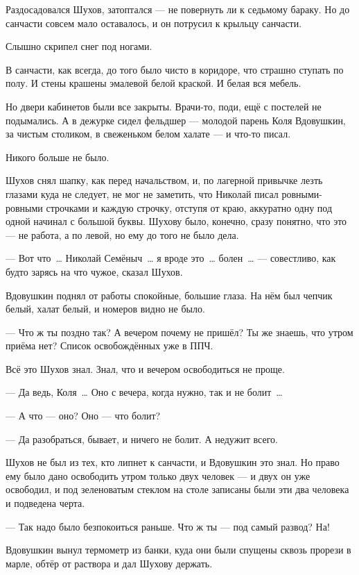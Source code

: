 Раздосадовался Шухов, затоптался --- не повернуть ли к седьмому бараку. Но до санчасти совсем мало оставалось, и он потрусил к крыльцу санчасти.

Слышно скрипел снег под ногами.

В санчасти, как всегда, до того было чисто в коридоре, что страшно ступать по полу. И стены крашены эмалевой белой краской. И белая вся мебель.

Но двери кабинетов были все закрыты. Врачи-то, поди, ещё с постелей не подымались. А в дежурке сидел фельдшер --- молодой парень Коля Вдовушкин, за чистым столиком, в свеженьком белом халате --- и что-то писал.

Никого больше не было.

Шухов снял шапку, как перед начальством, и, по лагерной привычке лезть глазами куда не следует, не мог не заметить, что Николай писал ровными-ровными строчками и каждую строчку, отступя от краю, аккуратно одну под одной начинал с большой буквы. Шухову было, конечно, сразу понятно, что это --- не работа, а по левой, но ему до того не было дела.

--- Вот что~\dots{} Николай Семёныч~\dots{} я вроде это~\dots{} болен~\dots{} --- совестливо, как будто зарясь на что чужое, сказал Шухов.

Вдовушкин поднял от работы спокойные, большие глаза. На нём был чепчик белый, халат белый, и номеров видно не было.

--- Что ж ты поздно так? А вечером почему не пришёл? Ты же знаешь, что утром приёма нет? Список освобождённых уже в ППЧ.

Всё это Шухов знал. Знал, что и вечером освободиться не проще.

--- Да ведь, Коля~\dots{} Оно с вечера, когда нужно, так и не болит~\dots{}

--- А что --- оно? Оно --- что болит?

--- Да разобраться, бывает, и ничего не болит. А недужит всего.

Шухов не был из тех, кто липнет к санчасти, и Вдовушкин это знал. Но право ему было дано освободить утром только двух человек --- и двух он уже освободил, и под зеленоватым стеклом на столе записаны были эти два человека и подведена черта.

--- Так надо было безпокоиться раньше. Что ж ты --- под самый развод? На!

Вдовушкин вынул термометр из банки, куда они были спущены сквозь прорези в марле, обтёр от раствора и дал Шухову держать.

